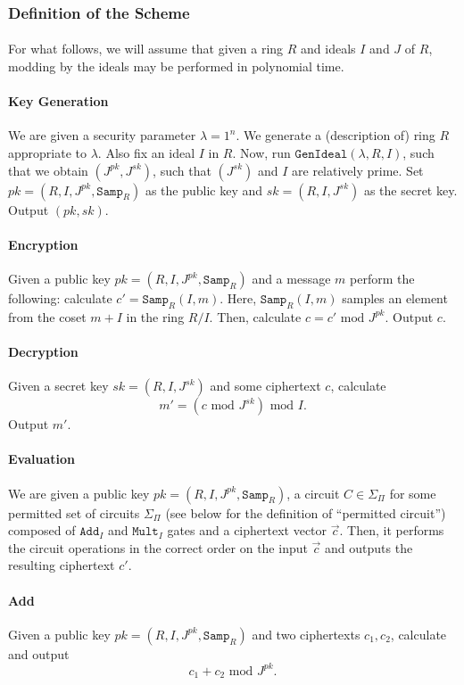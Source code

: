 \documentclass{article}
\theoremstyle{definition}
\theoremstyle{example}
\renewcommand{\mod}{\,\,\text{mod}\,\,}
\newcommand{\Add}{\texttt{Add}}
\newcommand{\Mult}{\texttt{Mult}}
\newcommand{\GenIdeal}{\texttt{GenIdeal}}
\newcommand{\Samp}{\texttt{Samp}}
\begin{document}
\subsubsection{Definition of the Scheme}
\paragraph{} For what follows, we will assume that given a ring $R$ and ideals
$I$ and $J$ of $R$, modding by the ideals may be performed in polynomial time.
\paragraph{Key Generation} We are given a security parameter $\lambda = 1^n$. We
generate a (description of) ring $R$ appropriate to $\lambda$. Also fix an ideal
$I$ in $R$. Now, run $\GenIdeal(\lambda, R, I)$, such that we obtain $(J^{pk},
J^{sk})$, such that $(J^{sk})$ and $I$ are relatively prime. Set $pk = (R, I,
J^{pk}, \Samp_R)$ as the public key and $sk = (R, I, J^{sk})$ as the secret key.
Output $(pk, sk)$.
\paragraph{Encryption} Given a public key $pk = (R, I, J^{pk}, \Samp_R)$ and a
message $m$ perform the following: calculate $c' = \Samp_R(I, m)$. Here,
$\Samp_R(I, m)$ samples an element from the coset $m + I$ in the ring $R/I$.
Then, calculate $c = c' \mod J^{pk}$. Output $c$.
\paragraph{Decryption} Given a secret key $sk = (R, I, J^{sk})$ and some
ciphertext $c$, calculate
\[
  m' = (c \mod J^{sk}) \mod I.
\]
Output $m'$.
\paragraph{Evaluation} We are given a public key $pk = (R, I, J^{pk}, \Samp_R)$, a
circuit $C \in \Sigma_\Pi$ for some permitted set of circuits $\Sigma_\Pi$ (see
below for the definition of ``permitted circuit'') composed of $\Add_I$ and $\Mult_I$ gates and a ciphertext vector
$\vec{c}$. Then, it performs the circuit operations in the correct order on the
input $\vec{c}$ and outputs the resulting ciphertext $c'$.
\paragraph{Add} Given a public key $pk = (R, I, J^{pk}, \Samp_R)$ and two
ciphertexts $c_1, c_2$, calculate and output
\[
  c_1 + c_2 \mod J^{pk}.
\]
\end{document}
